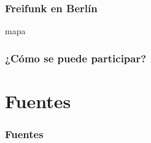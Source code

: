 \documentclass[12pt, xcolor=table]{beamer}
\begin{document}
\begin{frame}
  \frametitle{Freifunk en Berlín}
  mapa
\end{frame}

\begin{frame}
  \frametitle{¿Cómo se puede participar?}
\end{frame}

\section{Fuentes}
\begin{frame}
  \frametitle{Fuentes}
\end{frame}
\end{document}
